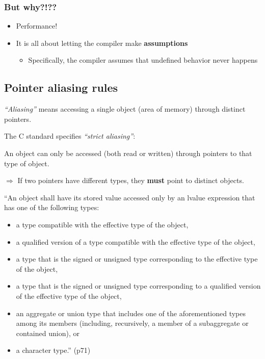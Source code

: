 \documentclass[12pt]{article}
\begin{document}
\subsubsection{But why?!??}

\begin{itemize}
  \item Performance!
  \item It is all about letting the compiler make \textbf{assumptions}
  \begin{itemize}
    \item Specifically, the compiler assumes that undefined behavior never happens
  \end{itemize}
\end{itemize}

\subsection{Pointer aliasing rules}

\textit{``Aliasing''} means accessing a single object (area of memory) through distinct pointers.

The C standard specifies \textit{``strict aliasing''}:

An object can only be accessed (both read or written) through pointers to that type of object.

$\Rightarrow$ If two pointers have different types, they \textbf{must} point to distinct objects.

``An object shall have its stored value accessed only by an lvalue expression
that has one of the following types:

\begin{itemize}
  \item a type compatible with the effective type of the object,
  \item a qualified version of a type compatible with the effective type of the object,
  \item a type that is the signed or unsigned type corresponding to the effective type of the object,
  \item a type that is the signed or unsigned type corresponding to a qualified version of the effective type of the object,
  \item an aggregate or union type that includes one of the aforementioned types among its members (including, recursively, a member of a subaggregate or contained union), or
  \item a character type.'' (p71)
\end{itemize}
\end{document}

